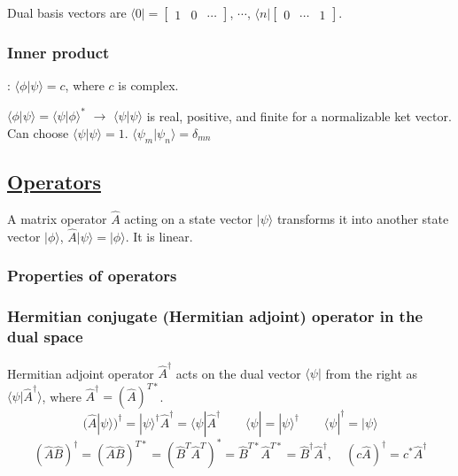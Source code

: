 Dual basis vectors are $\langle 0 | = \begin{bmatrix} 1 & 0 & \cdots \end{bmatrix}$, $\cdots$, $\langle n| \begin{bmatrix} 0 & \cdots & 1 \end{bmatrix}$.

\subsubsection{Inner product}: $\langle \phi | \psi \rangle = c$, where $c$ is complex.

$\langle \phi | \psi \rangle = \langle \psi | \phi \rangle^*$ $\rightarrow$ $\langle \psi | \psi \rangle$ is real, positive, and finite for a normalizable ket vector. Can choose $\langle \psi | \psi \rangle = 1$. $\langle \psi_m | \psi_n \rangle = \delta_{mn}$

\subsection{\underline{Operators}}
A matrix operator $\widehat{A}$ acting on a state vector $|\psi \rangle$ transforms it into another state vector $|\phi \rangle$, $\widehat{A} |\psi \rangle = | \phi \rangle$. It is linear.

\subsubsection{Properties of operators}

\subsubsection{Hermitian conjugate (Hermitian adjoint) operator in the dual space} \hfill

Hermitian adjoint operator $\widehat{A}^{\dag}$ acts on the dual vector $\langle \psi |$ from the right as $\langle \psi | \widehat{A} ^{\dag} \rangle$, where $\widehat{A}^{\dag} = (\widehat{A})^{T*}$.
$$(\widehat{A} | \psi \rangle)^{\dag} = |\psi \rangle^{\dag} \widehat{A}^{\dag} = \langle \psi | \widehat{A}^{\dag} \qquad \langle \psi | = | \psi \rangle^{\dag} \qquad \langle \psi | ^{\dag} = | \psi \rangle$$
$$(\widehat{A}\widehat{B})^{\dag} = (\widehat{A} \widehat{B})^{T*} = (\widehat{B}^T \widehat{A}^T)^* = \widehat{B}^{T*} \widehat{A}^{T*} = \widehat{B}^{\dag} \widehat{A}^{\dag}, \quad (c\widehat{A})^{\dag} = c^* \widehat{A}^{\dag}$$

